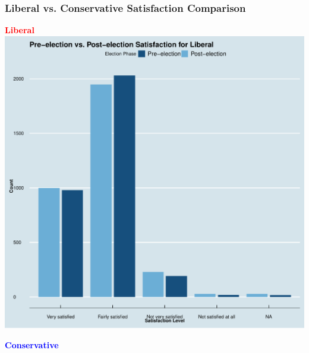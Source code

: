 \documentclass{beamer}
\begin{document}
\begin{frame}
    \frametitle{Liberal vs. Conservative Satisfaction Comparison}
    \begin{center}
        \begin{minipage}{0.48\textwidth} %
            \centering
            \textbf{\textcolor{red}{Liberal}} \\ %
            \includegraphics[width=\textwidth]{Pre-election vs. Post-election Satisfaction for Liberal.pdf}
        \end{minipage}
        \hfill
        \begin{minipage}{0.48\textwidth} %
            \centering
            \textbf{\textcolor{blue}{Conservative}} \\ %

\end{minipage}
\end{center}
\end{frame}
\end{document}
